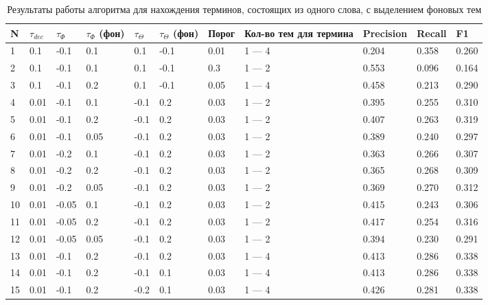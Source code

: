 \documentclass[a4paper, 12pt]{article}
\begin{document}
\begin{table}[!ht]
    \caption{Результаты работы алгоритма для нахождения терминов, состоящих из одного слова, с выделением фоновых тем}
    \label{table:Res_2}
    \centering\medskip
    \begin{tabular}{|l|l|l|l|l|l|l|p{50 pt}|l|l|l|}
    \hline
        N & $\tau_{dec}$ & $\tau_{\Phi}$ & $\tau_{\Phi}$ (фон) & $\tau_{\Theta}$  & $\tau_{\Theta}$ (фон) & Порог & Кол-во тем для термина & Precision & Recall & F1 \\ \hline
        1 & 0.1 & -0.1 & 0.1 & 0.1 & -0.1 & 0.01 & 1 — 4 & 0.204 & 0.358 & 0.260 \\ \hline
        2 & 0.1 & -0.1 & 0.1 & 0.1 & -0.1 & 0.3 & 1 — 2 & 0.553 & 0.096 & 0.164 \\ \hline
        3 & 0.1 & -0.1 & 0.2 & 0.1 & -0.1 & 0.05 & 1 — 4 & 0.458 & 0.213 & 0.290 \\ \hline
        4 & 0.01 & -0.1 & 0.1 & -0.1 & 0.2 & 0.03 & 1 — 2 & 0.395  & 0.255 & 0.310 \\ \hline
        5 & 0.01 & -0.1 & 0.2 & -0.1 & 0.2 & 0.03 & 1 — 2 & 0.407 & 0.263 & 0.319 \\ \hline
        6 & 0.01 & -0.1 & 0.05 & -0.1 & 0.2 & 0.03 & 1 — 2 & 0.389 & 0.240 & 0.297 \\ \hline
        7 & 0.01 & -0.2 & 0.1 & -0.1 & 0.2 & 0.03 & 1 — 2 & 0.363 & 0.266 & 0.307 \\ \hline
        8 & 0.01 & -0.2 & 0.2 & -0.1 & 0.2 & 0.03 & 1 — 2 & 0.365 & 0.268 & 0.309 \\ \hline
        9 & 0.01 & -0.2 & 0.05 & -0.1 & 0.2 & 0.03 & 1 — 2 & 0.369 & 0.270 & 0.312 \\ \hline
        10 & 0.01 & -0.05 & 0.1 & -0.1 & 0.2 & 0.03 & 1 — 2 & 0.415 & 0.243 & 0.306 \\ \hline
        11 & 0.01 & -0.05 & 0.2 & -0.1 & 0.2 & 0.03 & 1 — 2 & 0.417 & 0.254 & 0.316 \\ \hline
        12 & 0.01 & -0.05 & 0.05 & -0.1 & 0.2 & 0.03 & 1 — 2 & 0.394 & 0.230 & 0.291 \\ \hline
        \rowcolor{Gray}
        13 & 0.01 & -0.1 & 0.2 & -0.1 & 0.2 & 0.03 & 1 — 4 & 0.413 & 0.286 & 0.338 \\ \hline
        \rowcolor{Gray}
        14 & 0.01 & -0.1 & 0.2 & -0.1 & 0.1 & 0.03 & 1 — 4 & 0.413 & 0.286 & 0.338 \\ \hline
        \rowcolor{Gray}
        15 & 0.01 & -0.1 & 0.2 & -0.2 & 0.1 & 0.03 & 1 — 4 & 0.426 & 0.281 & 0.338 \\ \hline

\end{tabular}
\end{table}
\end{document}
